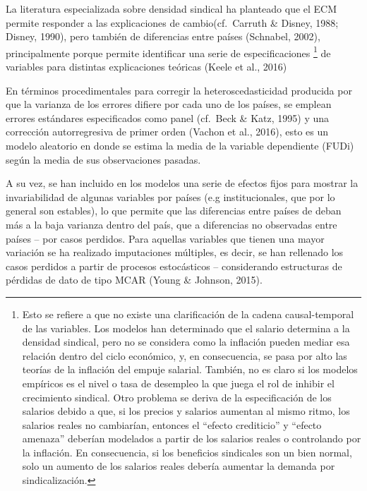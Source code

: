 \documentclass[
]{book}
\begin{document}
La literatura especializada sobre densidad sindical ha planteado que el ECM permite responder a las explicaciones de cambio(cf.~Carruth \& Disney, 1988; Disney, 1990), pero también de diferencias entre países (Schnabel, 2002), principalmente porque permite identificar una serie de especificaciones \footnote{Esto se refiere a que no existe una clarificación de la cadena causal-temporal de las variables. Los modelos han determinado que el salario determina a la densidad sindical, pero no se considera como la inflación pueden mediar esa relación dentro del ciclo económico, y, en consecuencia, se pasa por alto las teorías de la inflación del empuje salarial. También, no es claro si los modelos empíricos es el nivel o tasa de desempleo la que juega el rol de inhibir el crecimiento sindical. Otro problema se deriva de la especificación de los salarios debido a que, si los precios y salarios aumentan al mismo ritmo, los salarios reales no cambiarían, entonces el ``efecto crediticio'' y ``efecto amenaza'' deberían modelados a partir de los salarios reales o controlando por la inflación. En consecuencia, si los beneficios sindicales son un bien normal, solo un aumento de los salarios reales debería aumentar la demanda por sindicalización.} de variables para distintas explicaciones teóricas (Keele et al., 2016)

En términos procedimentales para corregir la heteroscedasticidad producida por que la varianza de los errores difiere por cada uno de los países, se emplean errores estándares especificados como panel (cf.~Beck \& Katz, 1995) y una corrección autorregresiva de primer orden (Vachon et al., 2016), esto es un modelo aleatorio en donde se estima la media de la variable dependiente (FUDi) según la media de sus observaciones pasadas.

A su vez, se han incluido en los modelos una serie de efectos fijos para mostrar la invariabilidad de algunas variables por países (e.g institucionales, que por lo general son estables), lo que permite que las diferencias entre países de deban más a la baja varianza dentro del país, que a diferencias no observadas entre países -- por casos perdidos. Para aquellas variables que tienen una mayor variación se ha realizado imputaciones múltiples, es decir, se han rellenado los casos perdidos a partir de procesos estocásticos -- considerando estructuras de pérdidas de dato de tipo MCAR (Young \& Johnson, 2015).
\end{document}
